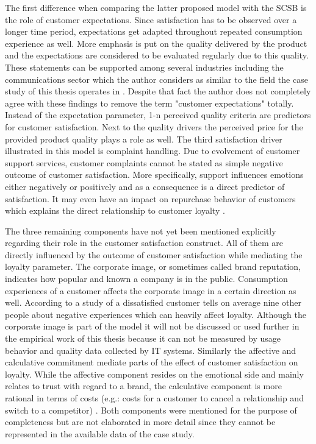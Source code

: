 The first difference when comparing the latter proposed model with the SCSB is the role of customer expectations. Since satisfaction has to be observed over a longer time period, expectations get adapted throughout repeated consumption experience as well. More emphasis is put on the quality delivered by the product and the expectations are considered to be evaluated regularly due to this quality. These statements can be supported among several industries including the communications sector which the author considers as similar to the field the case study of this thesis operates in \cite{johnson1996expectations} \cite{fornell1996american}. Despite that fact the author does not completely agree with these findings to remove the term "customer expectations" totally. Instead of the expectation parameter, 1-n perceived quality criteria are predictors for customer satisfaction. Next to the quality drivers the perceived price for the provided product quality plays a role as well. The third satisfaction driver illustrated in this model is complaint handling. Due to evolvement of customer support services, customer complaints cannot be stated as simple negative outcome of customer satisfaction. More specifically, support influences emotions either negatively or positively and as a consequence is a direct predictor of satisfaction. It may even have an impact on repurchase behavior of customers which explains the direct relationship to customer loyalty \cite{johnson2001evolution}. 

The three remaining components have not yet been mentioned explicitly regarding their role in the customer satisfaction construct. All of them are directly influenced by the outcome of customer satisfaction while mediating the loyalty parameter. The corporate image, or sometimes called brand reputation, indicates how popular and known a company is in the public. Consumption experiences of a customer affects the corporate image in a certain direction as well. According to a study of \cite{hussain2015service} a dissatisfied customer tells on average nine other people about negative experiences which can heavily affect loyalty. Although the corporate image is part of the model it will not be discussed or used further in the empirical work of this thesis because it can not be measured by usage behavior and quality data collected by IT systems. Similarly the affective and calculative commitment mediate parts of the effect of customer satisfaction on loyalty. While the affective component resides on the emotional side and mainly relates to trust with regard to a brand, the calculative component is more rational in terms of costs (e.g.: costs for a customer to cancel a relationship and switch to a competitor) \cite{johnson2001evolution}. Both components were mentioned for the purpose of completeness but are not elaborated in more detail since they cannot be represented in the available data of the case study. 

